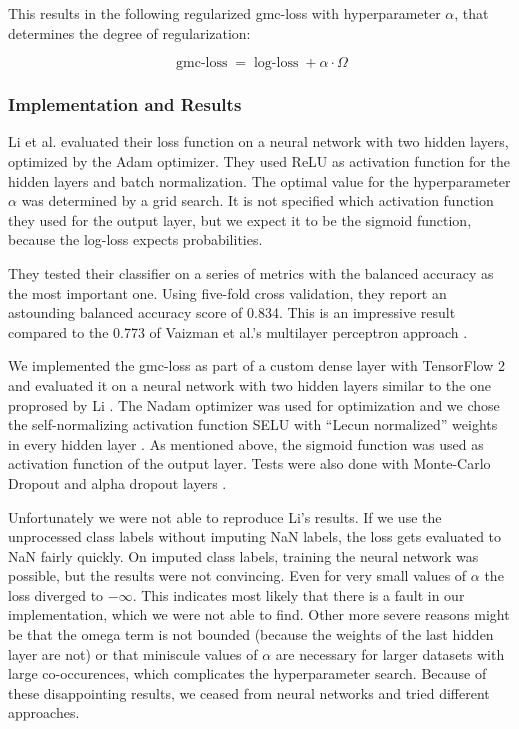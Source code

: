 This results in the following regularized gmc-loss with hyperparameter $\alpha$, that determines the degree of regularization:

\begin{equation}
	\operatorname{gmc-loss} = \operatorname{log-loss} + \alpha \cdot \Omega
\end{equation}

\subsubsection{Implementation and Results}

Li et al. evaluated their loss function on a neural network with two hidden layers, optimized by the Adam optimizer. They used ReLU as activation function for the hidden layers and batch normalization. The optimal value for the hyperparameter $\alpha$ was determined by a grid search. It is not specified which activation function they used for the output layer, but we expect it to be the sigmoid function, because the log-loss expects probabilities.

They tested their classifier on a series of metrics with the balanced accuracy as the most important one. Using five-fold cross validation, they report an astounding balanced accuracy score of 0.834. This is an impressive result compared to the 0.773 of Vaizman et al.'s multilayer perceptron approach \cite{Vaizman18}.

We implemented the gmc-loss as part of a custom dense layer with TensorFlow 2 and evaluated it on a neural network with two hidden layers similar to the one proprosed by Li \cite{tensorflow2015}. The Nadam optimizer was used for optimization \cite{Dozat2015} and we chose the self-normalizing activation function SELU with \enquote{Lecun normalized} weights in every hidden layer \cite{Klambauer17}. As mentioned above, the sigmoid function was used as activation function of the output layer. Tests were also done with Monte-Carlo Dropout and alpha dropout layers \cite{Gal2016}.

Unfortunately we were not able to reproduce Li's results. If we use the unprocessed class labels without imputing NaN labels, the loss gets evaluated to NaN fairly quickly. On imputed class labels, training the neural network was possible, but the results were not convincing. Even for very small values of $\alpha$ the loss diverged to $-\infty$. This indicates most likely that there is a fault in our implementation, which we were not able to find. Other more severe reasons might be that the omega term is not bounded (because the weights of the last hidden layer are not) or that miniscule values of $\alpha$ are necessary for larger datasets with large co-occurences, which complicates the hyperparameter search.
Because of these disappointing results, we ceased from neural networks and tried different approaches. 